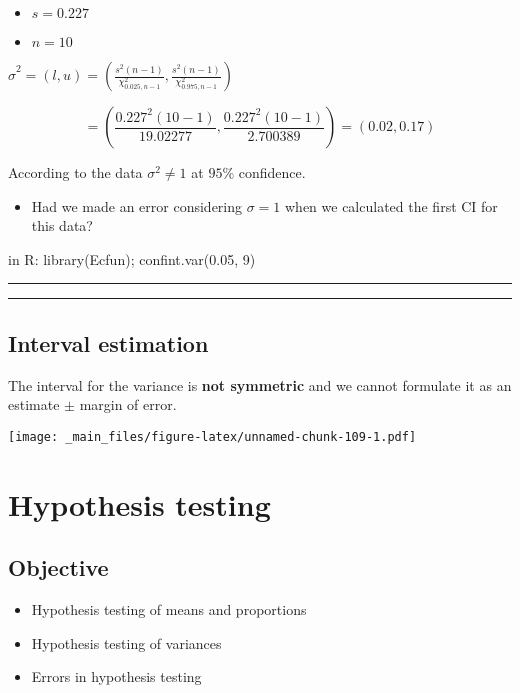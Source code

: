 \documentclass[
]{book}
\providecommand{\tightlist}{%
  \setlength{\itemsep}{0pt}\setlength{\parskip}{0pt}}
\begin{document}
\begin{itemize}
\tightlist
\item
  \(s=0.227\)
\item
  \(n=10\)
\end{itemize}

\(\hat{\sigma}^2=(l,u) = (\frac{s^2 (n-1)}{\chi^2_{0.025,n-1}},\frac{s^2(n-1)}{\chi^2_{0.975,n-1}})\)

\[= (\frac{0.227^2 (10-1)}{19.02277},\frac{0.227^2(10-1)}{2.700389})=(0.02,0.17)\]

According to the data \(\sigma^2 \neq 1\) at \(95\%\) confidence.

\begin{itemize}
\tightlist
\item
  Had we made an error considering \(\sigma=1\) when we calculated the first CI for this data?
\end{itemize}

in R: library(Ecfun);
confint.var(0.05, 9)

\begin{center}\rule{0.5\linewidth}{0.5pt}\end{center}

\begin{center}\rule{0.5\linewidth}{0.5pt}\end{center}

\hypertarget{interval-estimation-10}{%
\section{Interval estimation}\label{interval-estimation-10}}

The interval for the variance is \textbf{not symmetric} and we cannot formulate it as an estimate \(\pm\) margin of error.

\texttt{[image: \_main\_files/figure-latex/unnamed-chunk-109-1.pdf]}

\hypertarget{hypothesis-testing}{%
\chapter{Hypothesis testing}\label{hypothesis-testing}}

\hypertarget{objective-13}{%
\section{Objective}\label{objective-13}}

\begin{itemize}
\tightlist
\item
  Hypothesis testing of means and proportions
\item
  Hypothesis testing of variances
\item
  Errors in hypothesis testing
\end{itemize}
\end{document}

